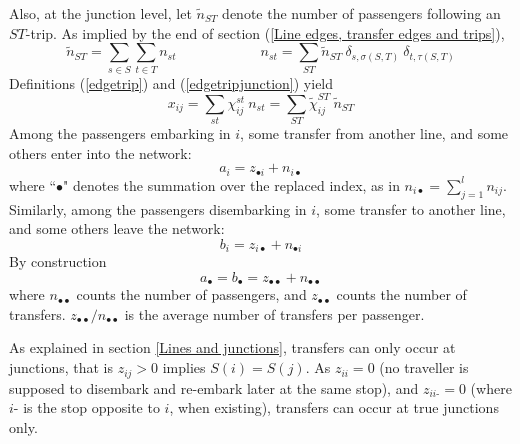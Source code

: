 \documentclass{bmcart}
\begin{document}
Also, 
at the junction level, let $\tilde{n}_{ST}$ denote the number of passengers following an $ST$-trip. As implied by the end of section (\ref{Line edges, transfer edges and trips}), 
\begin{equation}
\label{equivnntilde}
\tilde{n}_{ST}=\sum_{s\in S}\sum_{t\in T}n_{st} \qquad\qquad\qquad n_{st}=\sum_{ST}\tilde{n}_{ST}\: \delta_{s,\sigma(S,T)}\: \delta_{t,\tau(S,T)}
\end{equation}
Definitions (\ref{edgetrip}) and (\ref{edgetripjunction}) yield
\begin{equation}
\label{equationGG}
x_{ij}=\sum_{st}\chi_{ij}^{st}\:  n_{st}=\sum_{ST}\tilde{\chi}_{ij}^{ST}\:  \tilde{n}_{ST}
\end{equation}
Among the passengers embarking in $i$, some transfer from another line, and some others enter into the network: 
\begin{equation}
\label{entrer}
a_i=z_{\bullet i}+n_{i\bullet}
\end{equation}
where  ``$\bullet$" denotes the summation over the replaced index, as in $n_{i\bullet}=\sum_{j=1}^l n_{ij}$. Similarly, among the passengers disembarking in $i$, some transfer to another line, and some others leave the network: 
\begin{equation}
\label{sortir}
b_i=z_{i\bullet}+n_{\bullet i}
\end{equation}
By construction
\begin{displaymath}
a_{\bullet}=b_{\bullet}=z_{\bullet\bullet}+n_{\bullet\bullet}
\end{displaymath}
where $n_{\bullet\bullet}$ counts the number of passengers, and $z_{\bullet\bullet}$ counts the number of transfers. $z_{\bullet\bullet}/n_{\bullet\bullet}$  is the average number of transfers per passenger. 

\vspace*{0.1cm}



As explained in section \ref{Lines and junctions}, transfers can only occur at junctions, that is $z_{ij}>0$ implies $S(i)=S(j)$. As $z_{ii}=0$ (no traveller is supposed to disembark and re-embark later at the same stop), and $z_{ii\text{-}}=0$ (where $i\text{-}$ is the stop opposite to $i$, when existing), transfers can occur at true junctions only. 

\vspace*{0.1cm}
\end{document}
